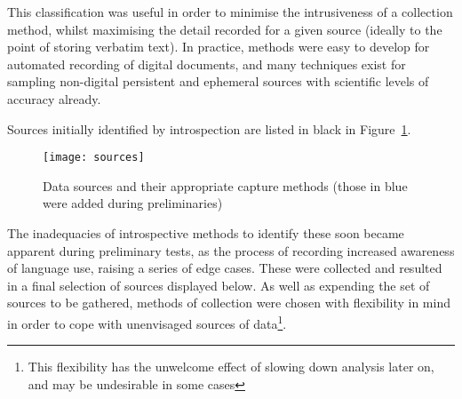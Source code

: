 This classification was useful in order to minimise the intrusiveness of a collection method, whilst maximising the detail recorded for a given source (ideally to the point of storing verbatim text).  In practice, methods were easy to develop for automated recording of digital documents, and many techniques exist for sampling non-digital persistent and ephemeral sources with scientific levels of accuracy already.

Sources initially identified by introspection are listed in black in Figure~\ref{fig:personal:datasources}.

\begin{figure}[p]
\centering
\texttt{[image: sources]}
\caption{Data sources and their appropriate capture methods (those in blue were added during preliminaries)}
\label{fig:personal:datasources}
\end{figure}



The inadequacies of introspective methods to identify these soon became apparent during preliminary tests, as the process of recording increased awareness of language use, raising a series of edge cases.  These were collected and resulted in a final selection of sources displayed below.  As well as expending the set of sources to be gathered, methods of collection were chosen with flexibility in mind in order to cope with unenvisaged sources of data\footnote{This flexibility has the unwelcome effect of slowing down analysis later on, and may be undesirable in some cases}.



